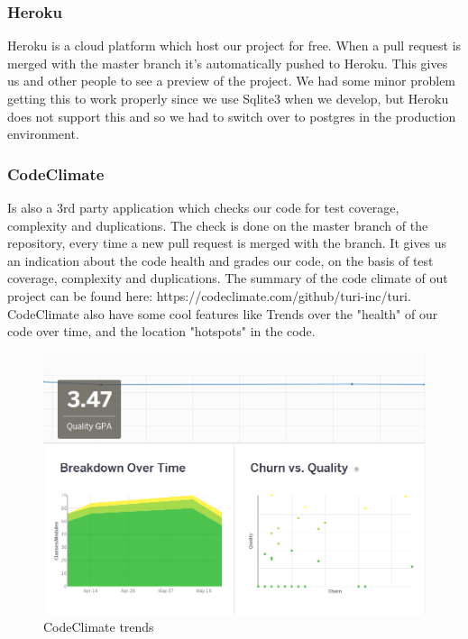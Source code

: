 \documentclass[a4paper]{article}
\begin{document}
\subsubsection{Heroku}
Heroku is a cloud platform which host our project for free. When a pull request is merged with the master branch it's automatically pushed to Heroku. This gives us and other people to see a preview of the project. We had some minor problem getting this to work properly since we use Sqlite3 when we develop, but Heroku does not support this and so we had to switch over to postgres in the production environment.

\subsubsection{CodeClimate}
Is also a 3rd party application which checks our code for test coverage, complexity and duplications. The check is done on the master branch of the repository, every time a new pull request is merged with the branch. It gives us an indication about the code health and grades our code, on the basis of test coverage, complexity and duplications. The summary of the code climate of out project can be found here: https://codeclimate.com/github/turi-inc/turi. \\
CodeClimate also have some cool features like Trends over the "health" of our code over time, and the location "hotspots" in the code.  

\begin{figure}
  \begin{center}
    \includegraphics[scale=0.45]{pictures/trends_code.png}
    \caption{CodeClimate trends}
    \label{fig:}
  \end{center}
\end{figure}
\end{document}
